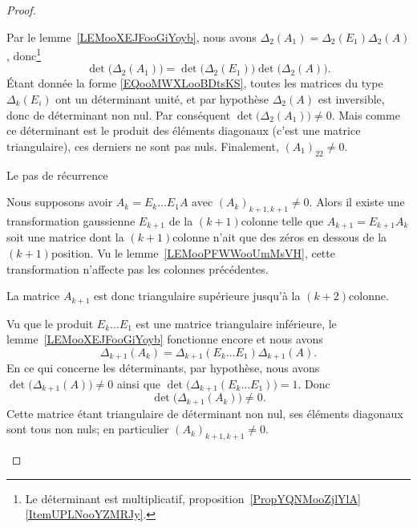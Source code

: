 \begin{proof}
\begin{subproof}
            Par le lemme~\ref{LEMooXEJFooGiYoyb}, nous avons \( \Delta_2(A_1)=\Delta_2(E_1)\Delta_2(A)\), donc\footnote{Le déterminant est multiplicatif, proposition~\ref{PropYQNMooZjlYlA}\ref{ItemUPLNooYZMRJy}.}
            \begin{equation}
                \det\big( \Delta_2(A_1) \big)=\det\big( \Delta_2(E_1) \big)\det\big( \Delta_2(A) \big).
            \end{equation}
            Étant donnée la forme \eqref{EQooMWXLooBDtsKS}, toutes les matrices du type \( \Delta_k(E_i)\) ont un déterminant unité, et par hypothèse \( \Delta_2(A)\) est inversible, donc de déterminant non nul. Par conséquent \( \det\big( \Delta_2(A_1) \big)\neq 0\). Mais comme ce déterminant est le produit des éléments diagonaux (c'est une matrice triangulaire), ces derniers ne sont pas nuls. Finalement, \( (A_1)_22\neq 0\).

        \item[Le pas de récurrence]

            Nous supposons avoir \( A_k=E_k\ldots E_1A\) avec \( (A_k)_{k+1,k+1}\neq 0\). Alors il existe une transformation gaussienne \( E_{k+1}\) de la \( (k+1)\)\ieme colonne telle que \( A_{k+1}=E_{k+1}A_k\) soit une matrice dont la \( (k+1)\)\ieme colonne n'ait que des zéros en dessous de la \( (k+1)\)\ieme position. Vu le lemme~\ref{LEMooPFWWooUmMsVH}, cette transformation n'affecte pas les colonnes précédentes.

            La matrice \( A_{k+1}\) est donc triangulaire supérieure jusqu'à la \( (k+2)\)\ieme colonne.

            Vu que le produit \( E_k\ldots E_1\) est une matrice triangulaire inférieure, le lemme~\ref{LEMooXEJFooGiYoyb} fonctionne encore et nous avons
            \begin{equation}
                \Delta_{k+1}(A_k)=\Delta_{k+1}(E_k\ldots E_1)\Delta_{k+1}(A).
            \end{equation}
            En ce qui concerne les déterminants, par hypothèse, nous avons \( \det\big( \Delta_{k+1}(A) \big)\neq 0\) ainsi que \( \det\big( \Delta_{k+1}(E_k\ldots E_1) \big)=1\). Donc
            \begin{equation}
                \det\big( \Delta_{k+1}(A_k) \big)\neq 0.
            \end{equation}
            Cette matrice étant triangulaire de déterminant non nul, ses éléments diagonaux sont tous non nuls; en particulier \( (A_k)_{k+1,k+1}\neq 0\).
    \end{subproof}


\end{proof}
